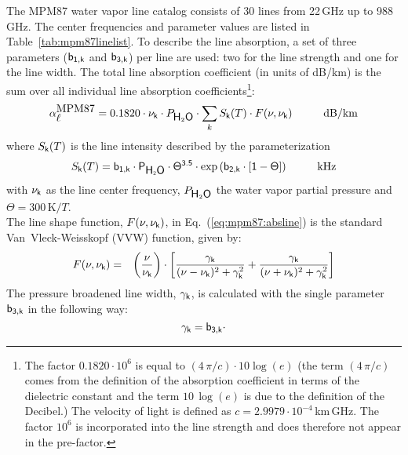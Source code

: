 {
\label{levele:mpm87_h2olines}
The MPM87 \cite{liebeandlayton:87} water vapor line catalog consists 
of 30 lines from 22\,GHz up to 988\,GHz. The center frequencies and parameter 
values are listed in Table~\ref{tab:mpm87linelist}. To describe the line 
absorption, a set of three parameters ($\sf b_{\sf 1,k}$ and $\sf b_{\sf 3,k}$) per line are used: two 
for the line strength and one for the line width. The total line 
absorption coefficient (in units of dB/km) is the sum over all 
individual line absorption coefficients\footnote{The factor 
  $0.1820 \cdot 10^{6}$ is equal to $(4\,\pi/c)\cdot 10\log{(e)}$
  (the term $(4\,\pi/c)$ comes from the definition of the absorption
  coefficient in terms of the dielectric constant and the term 
  $10\,\log{(e)}$ is due to the definition of the Decibel.) The
  velocity of light is defined as $c=2.9979\cdot 10^{-4}$\,km\,GHz. 
  The factor $10^{6}$ is incorporated into the line strength and 
  does therefore not appear in the pre-factor.}:
\begin{equation}
  \label{eq:mpm87:absline}
  \alphampmol = 0.1820 \cdot \nuk \cdot \phzo \cdot 
  \sum_{k}{\inten \cdot \shape}\hspace*{10mm}\mbox{dB/km}
\end{equation}
where $S_{\sf k}(T)$ is the line intensity described by the parameterization
\begin{equation}
  \label{eq:mpm87:strength}
  \inten = \bek \cdot \phzo \cdot \Theta^{3.5} 
           \cdot \exp{(\bzk \cdot [1-\Theta])}\hspace*{10mm}\mbox{kHz}
\end{equation}
with $\nu_{\sf k}$ as the line center frequency, $P_{\mbox{\sf H}_{2}\mbox{\sf O}}$ the water
vapor partial pressure and $\Theta = 300\,\mbox{K}/T$.\\
The line shape function, $F(\nu,\nu_{\sf k})$, in Eq.~(\ref{eq:mpm87:absline}) 
is the standard Van~Vleck-Weisskopf (VVW) function, given by:
\begin{eqnarray}
  \label{eq:mpm87:VVW}
  F(\nu,\nu_{\sf k}) & = & \left(\frac{\nu}{\nu_{\sf k}}\right) \cdot 
               \left[\frac{\gamma_{\sf k}}{(\nu - \nu_{\sf k})^2 + \gamma_{\sf k}^2} + 
                     \frac{\gamma_{\sf k}}{(\nu + \nu_{\sf k})^2 + \gamma_{\sf k}^2}\right]\\
\end{eqnarray}
The pressure broadened line width, $\gamma_{\sf k}$, is calculated with the 
single parameter $\sf b_{\sf 3,k}$ in the following way:
\begin{equation}
  \label{eq:mpm87:gamma}
  \gamk = \bdk \cdot 

\end{equation}}
